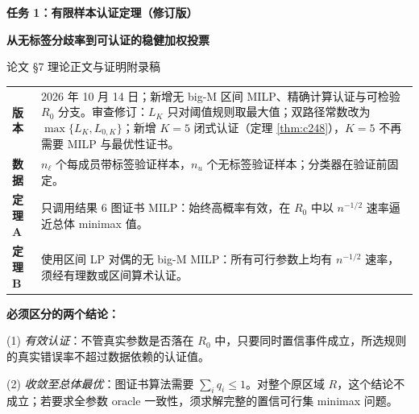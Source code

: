 \documentclass[11pt,a4paper]{ctexart}
\theoremstyle{definition}
\begin{document}
\thispagestyle{empty}
\vspace*{1.1cm}
\noindent{\color{teal}\rule{\textwidth}{1.7pt}}\par
\vspace{.6cm}
{\Huge\bfseries 任务 1：有限样本认证定理（修订版）}\par
\vspace{.24cm}
{\LARGE\bfseries 从无标签分歧率到可认证的稳健加权投票}\par
\vspace{.6cm}
{\Large 论文 \S7 理论正文与证明附录稿}\par
\vspace{.7cm}
\noindent\begin{tabularx}{\textwidth}{@{}p{27mm}X@{}}
\textbf{版本} & 2026 年 10 月 14 日；新增无 big-M 区间 MILP、精确计算认证与可检验 $R_0$ 分支。审查修订：$L_K$ 只对阈值规则取最大值；双路径常数改为 $\max\{L_K,L_{0,K}\}$；新增 $K=5$ 闭式认证（定理 \ref{thm:c248}），$K=5$ 不再需要 MILP 与最优性证书。\\
\textbf{数据} & $n_\ell$ 个每成员带标签验证样本，$n_u$ 个无标签验证样本；分类器在验证前固定。\\
\textbf{定理 A} & 只调用结果 6 图证书 MILP：始终高概率有效，在 $R_0$ 中以 $n^{-1/2}$ 速率逼近总体 minimax 值。\\
\textbf{定理 B} & 使用区间 LP 对偶的无 big-M MILP：所有可行参数上均有 $n^{-1/2}$ 速率，须经有理数或区间算术认证。\\
\end{tabularx}
\vfill
\begin{keybox}
\textbf{必须区分的两个结论：}\par
(1) \emph{有效认证}：不管真实参数是否落在 $R_0$ 中，只要同时置信事件成立，所选规则的真实错误率不超过数据依赖的认证值。\par
(2) \emph{收敛至总体最优}：图证书算法需要 $\sum_iq_i\le1$。对整个原区域 $R$，这个结论不成立；若要求全参数 oracle 一致性，须求解完整的置信可行集 minimax 问题。
\end{keybox}
\vspace{.6cm}
\newpage
\tableofcontents
\newpage
\end{document}
